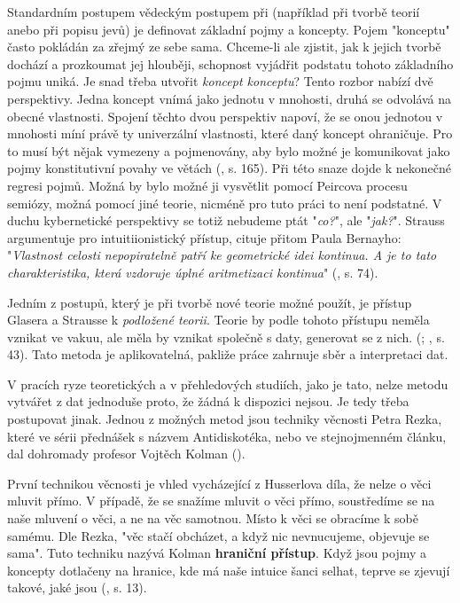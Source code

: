\documentclass[11pt,a4paper]{article}
\begin{document}
Standardním postupem vědeckým postupem při (například při tvorbě teorií anebo při popisu jevů) je definovat základní pojmy a koncepty. Pojem "konceptu" často pokládán za zřejmý ze sebe sama. Chceme-li ale zjistit, jak k jejich tvorbě dochází a prozkoumat jej hlouběji, schopnost vyjádřit podstatu tohoto základního pojmu uniká. Je snad třeba utvořit \textit{koncept konceptu}? Tento rozbor nabízí dvě perspektivy. Jedna koncept vnímá jako jednotu v mnohosti, druhá se odvolává na obecné vlastnosti. Spojení těchto dvou perspektiv napoví, že se onou jednotou v mnohosti míní právě ty univerzální vlastnosti, které daný koncept ohraničuje. Pro to musí být nějak vymezeny a pojmenovány, aby bylo možné je komunikovat jako pojmy konstitutivní povahy ve větách (\cite{strauss_scope_2002}, s. 165). Při této snaze dojde k nekonečné regresi pojmů. Možná by bylo možné ji vysvětlit pomocí Peircova procesu semiózy, možná pomocí jiné teorie, nicméně pro tuto práci to není podstatné. V duchu kybernetické perspektivy se totiž nebudeme ptát "\textit{co?}", ale "\textit{jak?}". Strauss argumentuje pro intuitiionistický přístup, cituje přitom Paula Bernayho: "\textit{Vlastnost celosti nepopiratelně patří ke geometrické idei kontinua. A je to tato charakteristika, která vzdoruje úplné aritmetizaci kontinua}" (\cite{strauss_scope_2002, bernays_abhandlungen_1976}, s. 74). 

Jedním z postupů, který je při tvorbě nové teorie možné použít, je přístup Glasera a Strausse k \textit{podložené teorii}. Teorie by podle tohoto přístupu neměla vznikat ve vakuu, ale měla by vznikat společně s daty, generovat se z nich. (\cite{glaser_discovery_2017}; \cite{barbara_m_wildemuth_questions_2017}, s. 43). Tato metoda je aplikovatelná, pakliže práce zahrnuje sběr a interpretaci dat.

V pracích ryze teoretických a v přehledových studiích, jako je tato, nelze metodu vytvářet z dat jednoduše proto, že žádná k dispozici nejsou. Je tedy třeba postupovat jinak. Jednou z možných metod jsou techniky věcnosti Petra Rezka, které ve sérii přednášek s názvem Antidiskotéka, nebo ve stejnojmenném článku, dal dohromady profesor Vojtěch Kolman (\cite{kolman_antidiskoteka_2022}). 

První technikou věcnosti je vhled vycházející z Husserlova díla, že nelze o věci mluvit přímo. V případě, že se snažíme mluvit o věci přímo, soustředíme se na naše mluvení o věci, a ne na věc samotnou. Místo k věci se obracíme k sobě samému. Dle Rezka, "věc stačí obcházet, a když nic nevnucujeme, objevuje se sama". Tuto techniku nazývá Kolman \textbf{hraniční přístup}. Když jsou pojmy a koncepty dotlačeny na hranice, kde má naše intuice šanci selhat, teprve se zjevují takové, jaké jsou (\cite{rezek_telo_2010}, s. 13).
\end{document}
